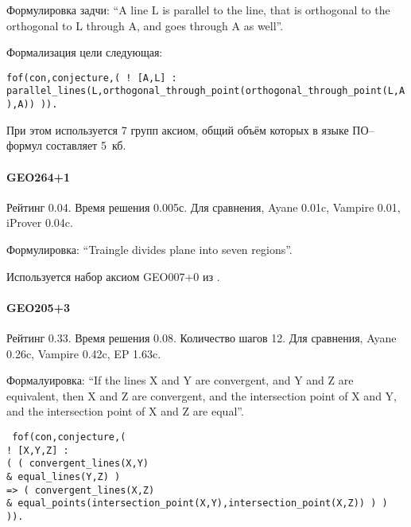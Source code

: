 Формулировка задчи: ``A line L is parallel to the line, that is orthogonal to the orthogonal to L through A, and goes through A as well''.

Формализация цели следующая:

\texttt{fof(con,conjecture,(
    ! [A,L] : parallel\_lines(L,orthogonal\_through\_point(orthogonal\_through\_point(L,A),A)) )).
    }

При этом используется 7 групп аксиом, общий объём которых в языке ПО--формул составляет 5~кб.

\paragraph{GEO264+1}
Рейтинг 0.04. Время решения 0.005с. Для сравнения, Ayane 0.01c, Vampire 0.01, iProver 0.04c.

Формулировка: ``Traingle divides plane into seven regions''.



Используется набор аксиом GEO007+0 из \cite{constrgeo}.

\paragraph{GEO205+3}
Рейтинг 0.33. Время решения 0.08. Количество шагов 12. Для сравнения, Ayane 0.26c, Vampire 0.42c, EP 1.63c.

Формалуировка: ``If the lines X and Y are convergent, and Y and Z are  equivalent, then X and Z are convergent, and the intersection   point of X and Y, and the intersection point of X and Z are equal''.

\texttt{
fof(con,conjecture,(\\
    ! [X,Y,Z] :\\
      ( ( convergent\_lines(X,Y)\\
        \& equal\_lines(Y,Z) )\\
     => ( convergent\_lines(X,Z)\\
        \& equal\_points(intersection\_point(X,Y),intersection\_point(X,Z)) ) ) )).\\
        }


